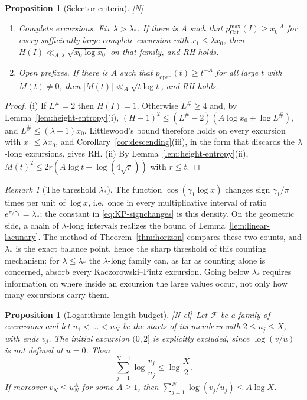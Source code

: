\documentclass[11pt]{amsart}
\numberwithin{equation}{section}
\theoremstyle{plain}
\newtheorem{proposition}[theorem]{Proposition}
\theoremstyle{definition}
\theoremstyle{remark}
\newtheorem{remark}[theorem]{Remark}
\newcommand{\F}{\mathcal{F}}
\newcommand{\tagN}{\textup{[N]}}
\newcommand{\tagNE}{\textup{[N-el]}}
\begin{document}
\begin{proposition}[Selector criteria]
\label{prop:selector-criteria}
\tagN\ \begin{enumerate}[label=\textup{(\roman*)}]
\item \emph{Complete excursions.} Fix $\lambda>\lambda_*$. If there is $A$
such that $p^{\max}_{\mathrm{Cat}}(I)\ge x_0^{-A}$ for every sufficiently
large complete excursion with $x_1\le\lambda x_0$, then
$H(I)\ll_{A,\lambda}\sqrt{x_0\log x_0}$ on that family, and RH holds.
\item \emph{Open prefixes.} If there is $A$ such that
$p_{\mathrm{open}}(t)\ge t^{-A}$ for all large $t$ with $M(t)\ne0$, then
$|M(t)|\ll_A\sqrt{t\log t}$, and RH holds.
\end{enumerate}
\end{proposition}

\begin{proof}
(i) If $L^\#=2$ then $H(I)=1$. Otherwise $L^\#\ge4$ and, by
Lemma~\ref{lem:height-entropy}(i), $(H-1)^2\le(L^\#-2)(A\log x_0+\log L^\#)$, and $L^\#\le(\lambda-1)x_0$.
Littlewood's bound therefore holds on every excursion with
$x_1\le\lambda x_0$, and Corollary~\ref{cor:descending}(iii), in the form
that discards the $\lambda$-long excursions, gives RH.
(ii) By Lemma~\ref{lem:height-entropy}(ii),
$M(t)^2\le2r(A\log t+\log(4\sqrt r))$ with $r\le t$.
\end{proof}





\begin{remark}[The threshold $\lambda_*$]
\label{rem:lambda-star}
The function $\cos(\gamma_1\log x)$ changes sign $\gamma_1/\pi$ times per
unit of $\log x$, i.e.\ once in every multiplicative interval of ratio
$e^{\pi/\gamma_1}=\lambda_*$; the constant in \eqref{eq:KP-signchanges} is
this density. On the geometric side, a chain of $\lambda$-long intervals
realizes the bound of Lemma~\ref{lem:linear-lacunary}. The method of
Theorem~\ref{thm:horizon} compares these two counts, and $\lambda_*$ is the
exact balance point, hence the sharp threshold of this counting mechanism:
for $\lambda\le\lambda_*$ the $\lambda$-long
family can, as far as counting alone is concerned, absorb every
Kaczorowski--Pintz excursion. Going below $\lambda_*$ requires information
on where inside an excursion the large values occur, not only how many
excursions carry them.
\end{remark}

\begin{proposition}[Logarithmic-length budget]
\label{prop:log-budget}
\tagNE\ Let $\F$ be a family of excursions and let $u_1<\dots<u_N$ be the starts of
its members with $2\le u_j\le X$, with ends $v_j$.  The initial excursion
$(0,2]$ is explicitly excluded, since $\log(v/u)$ is not defined at
$u=0$.  Then
\[
\sum_{j=1}^{N-1}\log\frac{v_j}{u_j}\le\log\frac X2 .
\]
If moreover $v_N\le u_N^A$ for some $A\ge1$, then
$\sum_{j=1}^{N}\log(v_j/u_j)\le A\log X$.
\end{proposition}
\end{document}
